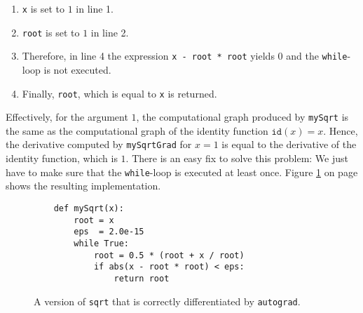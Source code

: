 \begin{enumerate}
\item \texttt{x} is set to $1$ in line 1.
\item \texttt{root} is set to $1$ in line 2.
\item Therefore, in line 4 the expression \texttt{x - root * root} yields $0$ and the \texttt{while}-loop is
      not executed.
\item Finally, \texttt{root}, which is equal to \texttt{x} is returned.
\end{enumerate}
Effectively, for the argument $1$, the computational graph produced by \texttt{mySqrt} is the same as the
computational graph of the identity function $\mathtt{id}(x) = x$.  Hence, the derivative computed by
\texttt{mySqrtGrad} for $x=1$ is equal to the derivative of the identity function, which is $1$.   There is an
easy fix to solve this problem:  We just have to make sure that the \texttt{while}-loop is executed at least
once.  Figure \ref{fig:autograd-intro-3.ipynb} on page \pageref{fig:autograd-intro-3.ipynb} shows the resulting
implementation.

\begin{figure}[!ht]
\centering
\begin{verbatim}
    def mySqrt(x): 
        root = x
        eps  = 2.0e-15
        while True:
            root = 0.5 * (root + x / root)
            if abs(x - root * root) < eps:
                return root
\end{verbatim}
\vspace*{-0.3cm}
\caption{A version of \texttt{sqrt} that is correctly differentiated by \texttt{autograd}.}
\label{fig:autograd-intro-3.ipynb}
\end{figure}



